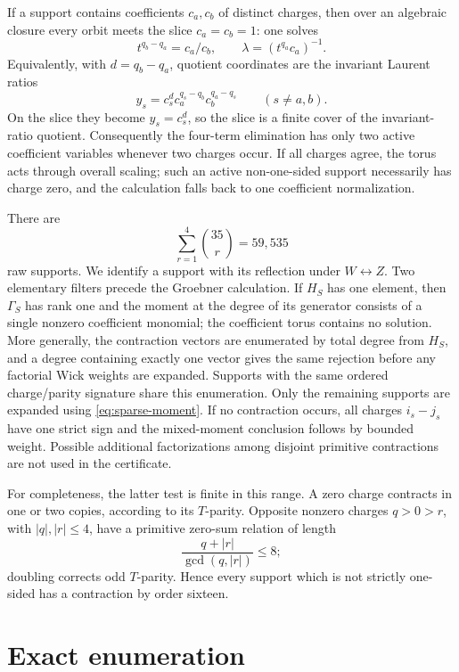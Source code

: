 \documentclass[11pt]{article}
\begin{document}
If a support contains coefficients \(c_a,c_b\) of distinct charges, then
over an algebraic closure every orbit meets the slice \(c_a=c_b=1\):
one solves
\[
  t^{q_b-q_a}=c_a/c_b,\qquad
  \lambda=(t^{q_a}c_a)^{-1}.
\]
Equivalently, with \(d=q_b-q_a\), quotient coordinates are the invariant
Laurent ratios
\[
  y_s=c_s^d c_a^{q_s-q_b}c_b^{q_a-q_s}
  \qquad(s\neq a,b).
\]
On the slice they become \(y_s=c_s^d\), so the slice is a finite cover of
the invariant-ratio quotient.  Consequently the four-term elimination has
only two active coefficient variables whenever two charges occur.  If all
charges agree, the torus acts through overall scaling; such an active
non-one-sided support necessarily has charge zero, and the calculation
falls back to one coefficient normalization.

There are
\[
 \sum_{r=1}^4\binom{35}{r}=59{,}535
\]
raw supports.  We identify a support with its reflection under
\(W\leftrightarrow Z\).  Two elementary filters precede the Groebner
calculation.  If \(H_S\) has one element, then \(\Gamma_S\) has rank one
and the moment at the degree of its generator consists of a single
nonzero coefficient monomial; the coefficient torus contains no solution.
More generally, the contraction vectors are enumerated by total degree
from \(H_S\), and a degree containing exactly one vector gives the same
rejection before any factorial Wick weights are expanded.  Supports with
the same ordered charge/parity signature share this enumeration.  Only
the remaining supports are expanded using \eqref{eq:sparse-moment}.  If no
contraction occurs, all charges \(i_s-j_s\) have one strict sign and the
mixed-moment conclusion follows by bounded weight.  Possible additional
factorizations among disjoint primitive contractions are not used in the
certificate.

For completeness, the latter test is finite in this range.  A zero charge
contracts in one or two copies, according to its \(T\)-parity.  Opposite
nonzero charges \(q>0>r\), with \(|q|,|r|\leq4\), have a primitive
zero-sum relation of length
\[
 \frac{q+|r|}{\gcd(q,|r|)}\leq8;
\]
doubling corrects odd \(T\)-parity.  Hence every support which is not
strictly one-sided has a contraction by order sixteen.

\section{Exact enumeration}
\end{document}
